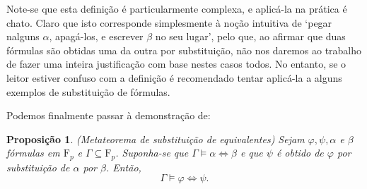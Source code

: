 \documentclass{report}
\newtheorem{prop}{Proposição}
\theoremstyle{definition}
\theoremstyle{remark}
\newcommand{\F}{\mathrm{F}}
\newcommand{\eqv}{\mathbin{\Leftrightarrow}}
\begin{document}
	Note-se que esta definição é particularmente complexa, e aplicá-la na prática é chato. Claro que isto corresponde simplesmente à noção intuitiva de `pegar nalguns $\alpha$, apagá-los, e escrever $\beta$ no seu lugar', pelo que, ao afirmar que duas fórmulas são obtidas uma da outra por substituição, não nos daremos ao trabalho de fazer uma inteira justificação com base nestes casos todos. No entanto, se o leitor estiver confuso com a definição é recomendado tentar aplicá-la a alguns exemplos de substituição de fórmulas.
	
	Podemos finalmente passar à demonstração de:
	
	\begin{prop}
	(Metateorema de substituição de equivalentes) Sejam $\varphi, \psi, \alpha$ e $\beta$ fórmulas em $\F_p$ e $\Gamma \subseteq \F_p$. Suponha-se que $\Gamma \vDash \alpha \eqv \beta$ e que $\psi$ é obtido de $\varphi$ por substituição de $\alpha$ por $\beta$. Então,
	\[\Gamma \vDash \varphi \eqv \psi.\]
	\end{prop}
	
\end{document}
